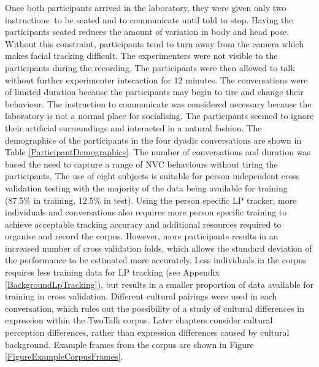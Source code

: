 Once both participants arrived in the laboratory, they were given only two instructions: to be seated and to communicate until told to stop. Having the participants seated reduces the amount of variation in body and head pose. Without this constraint, participants tend to turn away from the camera which makes facial tracking difficult. The experimenters were not visible to the participants during the recording. The participants were then allowed to talk without further experimenter interaction for 12 minutes. The conversations were of limited duration because the participants may begin to tire and change their behaviour. The instruction to communicate was considered necessary because the laboratory is not a normal place for socialising. The participants seemed to ignore their artificial surroundings and interacted in a natural fashion. The demographics of the participants in the four dyadic conversations are shown in Table \ref{ParticipantDemographics}. The number of conversations and duration was based the need to capture a range of \ac{NVC} behaviours without tiring the participants. The use of eight subjects is suitable for person independent cross validation testing with the majority of the data being available for training (87.5\% in training, 12.5\% in test). Using the person specific \ac{LP} tracker, more individuals and conversations also requires more person specific training to achieve acceptable tracking accuracy and additional resources required to organise and record the corpus. However, more participants results in an increased number of cross validation folds, which allows the standard deviation of the performance to be estimated more accurately. Less individuals in the corpus requires less training data for \ac{LP} tracking (see Appendix \ref{BackgroundLpTracking}), but results in a smaller proportion of data available for training in cross validation. Different cultural pairings were used in each conversation, which rules out the possibility of a study of cultural differences in expression within the TwoTalk corpus. Later chapters consider cultural perception differences, rather than expression differences caused by cultural background. Example frames from the corpus are shown in Figure \ref{FigureExampleCorpusFrames}.


